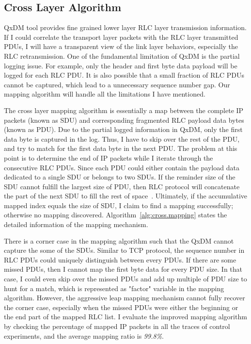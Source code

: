 \subsection{Cross Layer Algorithm}

QxDM tool provides fine grained lower layer RLC layer transmission information. If I could correlate the transport layer packets with the RLC layer transmitted PDUs, I will have a transparent view of the link layer behaviors, especially the RLC retransmission. One of the fundamental limitation of QxDM is the partial logging issue. For example, only the header and first byte data payload will be logged for each RLC PDU. It is also possible that a small fraction of RLC PDUs cannot be captured, which lead to a unnecessary sequence number gap. Our mapping algorithm will handle all the limitations I have mentioned.

The cross layer mapping algorithm is essentially a map between the complete IP packets (known as SDU) and corresponding fragmented RLC payload data bytes (known as PDU). Due to the partial logged information in QxDM, only the first data byte is captured in the log. Thus, I have to skip over the rest of the PDU, and try to match for the first data byte in the next PDU. The problem at this point is to determine the end of IP packets while I iterate through the consecutive RLC PDUs. Since each PDU could either contain the payload data dedicated to a single SDU or belongs to two SDUs. If the reminder size of the SDU cannot fulfill the largest size of PDU, then RLC protocol will concatenate the part of the next SDU to fill the rest of space~\cite{spec-3G-RLC}. Ultimately, if the accumulative mapped index equals the size of SDU, I claim to find a mapping successfully; otherwise no mapping discovered. Algorithm~\ref{alg:cross.mapping} states the detailed information of the mapping mechanism.

There is a corner case in the mapping algorithm such that the QxDM cannot capture the some of the SDUs. Similar to TCP protocol, the sequence number in RLC PDUs could uniquely distinguish between every PDUs. If there are some missed PDUs, then I cannot map the first byte data for every PDU size. In that case, I could even skip over the missed PDUs and add up multiple of PDU size to hunt for a match, which is represented as "factor" variable in the mapping algorithm. However, the aggressive leap mapping mechanism cannot fully recover the corner case, especially when the missed PDUs were either the beginning or the end part of the mapped RLC list. I evaluate the improved mapping algorithm by checking the percentage of mapped IP packets in all the traces of control experiments, and the average mapping ratio is \textit{99.8\%}.


